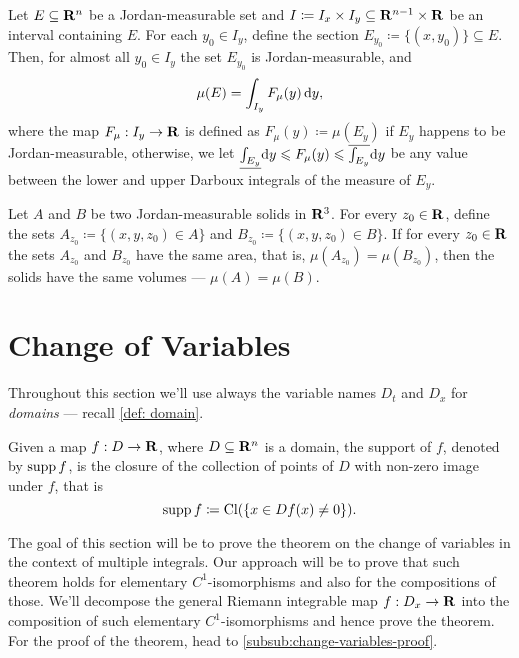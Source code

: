 \begin{corollary}
\label{cor:slicing-measurable-sets-and-integrating}
Let \(E \subseteq \mathbf{R}^n\) be a Jordan-measurable set and \(I \coloneq I_x \times
I_y \subseteq \mathbf{R}^{n-1} \times \mathbf{R}\) be an interval containing \(E\). For each
\(y_0 \in I_y\), define the section \(E_{y_0} \coloneq \{(x, y_{0})\} \subseteq
E\). Then, for almost all \(y_0 \in I_y\) the set \(E_{y_0}\) is
Jordan-measurable, and
\[
  \mu(E) = \int_{I_y} F_{\mu}(y)\, \mathrm{d} y,
\]
where the map \(F_{\mu}: I_y \to \mathbf{R}\) is defined as \(F_{\mu}(y) \coloneq
\mu(E_y)\) if \(E_y\) happens to be Jordan-measurable, otherwise, we let
\(\underline{\int_{E_y}} \mathrm{d} y \leqslant F_{\mu}(y) \leqslant \overline{\int_{E_y}}
\mathrm{d} y\) be any value between the lower and upper Darboux integrals of the
measure of \(E_y\).
\end{corollary}

\begin{corollary}
\label{cor:cavalieri-principle}
Let \(A\) and \(B\) be two Jordan-measurable solids in \(\mathbf{R}^3\). For every \(z_0
\in \mathbf{R}\), define the sets \(A_{z_0} \coloneq \{(x, y, z_{0}) \in A\}\) and
\(B_{z_0} \coloneq \{(x, y, z_{0}) \in B\}\). If for every \(z_0 \in \mathbf{R}\) the
sets \(A_{z_0}\) and \(B_{z_0}\) have the same area, that is, \(\mu(A_{z_0}) =
\mu(B_{z_0})\), then the solids have the same volumes --- \(\mu(A) = \mu(B)\).
\end{corollary}

\section{Change of Variables}

\begin{remark}
Throughout this section we'll use always the variable names \(D_t\) and \(D_x\)
for \emph{domains} --- recall \cref{def: domain}.
\end{remark}

\begin{definition}
\label{def:support-real-valued-map}
Given a map \(f: D \to \mathbf{R}\), where \(D \subseteq \mathbf{R}^n\) is a domain, the support
of \(f\), denoted by \(\operatorname{supp} f\), is the closure of the collection of points of
\(D\) with non-zero image under \(f\), that is
\[
  \operatorname{supp} f \coloneq \operatorname{Cl}(\{x \in D \relax f(x) \neq 0\}).
\]
\end{definition}

The goal of this section will be to prove the theorem on the change of variables
in the context of multiple integrals. Our approach will be to prove that such
theorem holds for elementary \(C^1\)-isomorphisms and also for the compositions
of those. We'll decompose the general Riemann integrable map \(f: D_x \to \mathbf{R}\)
into the composition of such elementary \(C^1\)-isomorphisms and hence prove the
theorem. For the proof of the theorem, head to
\cref{subsub:change-variables-proof}.

